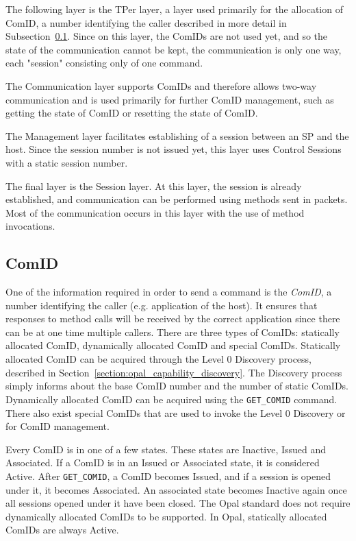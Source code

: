 The following layer is the TPer layer, a layer used primarily for the allocation of ComID, a number identifying the caller described in more detail in Subsection~\ref{subsection:comid}. Since on this layer, the ComIDs are not used yet, and so the state of the communication cannot be kept, the communication is only one way, each "session" consisting only of one command.

The Communication layer supports ComIDs and therefore allows two-way communication and is used primarily for further ComID management, such as getting the state of ComID or resetting the state of ComID.

The Management layer facilitates establishing of a session between an SP and the host. Since the session number is not issued yet, this layer uses Control Sessions with a static session number.

The final layer is the Session layer. At this layer, the session is already established, and communication can be performed using methods sent in packets. Most of the communication occurs in this layer with the use of method invocations.

\subsection{ComID}
\label{subsection:comid}

One of the information required in order to send a command is the \emph{ComID}, a number identifying the caller (e.g. application of the host). It ensures that responses to method calls will be received by the correct application since there can be at one time multiple callers. 
There are three types of ComIDs: statically allocated ComID, dynamically allocated ComID and special ComIDs.
Statically allocated ComID can be acquired through the Level 0 Discovery process, described in Section~\ref{section:opal_capability_discovery}. The Discovery process simply informs about the base ComID number and the number of static ComIDs.
Dynamically allocated ComID can be acquired using the \verb|GET_COMID| command.
There also exist special ComIDs that are used to invoke the Level 0 Discovery or for ComID management.

Every ComID is in one of a few states. These states are Inactive, Issued and Associated. If a ComID is in an Issued or Associated state, it is considered Active. After \verb|GET_COMID|, a ComID becomes Issued, and if a session is opened under it, it becomes Associated. An associated state becomes Inactive again once all sessions opened under it have been closed.
The Opal standard does not require dynamically allocated ComIDs to be supported.
In Opal, statically allocated ComIDs are always Active.

